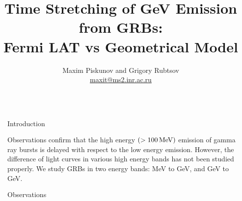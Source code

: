 \documentclass[final]{beamer}
\title{Time Stretching of GeV Emission from GRBs:\\[0.2ex]Fermi LAT vs Geometrical Model} %
\author{Maxim Piskunov and Grigory Rubtsov \\[.3ex] \normalsize \href{mailto:maxit@ms2.inr.ac.ru}{maxit@ms2.inr.ac.ru}} %
\institute{Institute for Nuclear Research RAS \\[2.0ex] \normalsize \url{https://github.com/maxitg/GammaRays}} %
\newlength{\sepwid}
\newlength{\onecolwid}
\begin{document}

\setlength{\belowcaptionskip}{2ex} %
\setlength\belowdisplayshortskip{2ex} %

\begin{frame}[t] %

\begin{columns}[t] %

\begin{column}{\sepwid}\end{column} %

\begin{column}{\onecolwid} %




\begin{block}{Introduction}

Observations confirm that the high energy $(> \unit[100]{MeV})$ emission of gamma ray bursts is delayed with respect to the low energy emission.
However, the difference of light curves in various high energy bands has not been studied properly.
We study GRBs in two energy bands: \unit[100]{MeV} to \unit[1]{GeV}, and \unit[1]{GeV} to \unit[300]{GeV}.

\end{block}


\begin{block}{Observations}


\end{block}
\end{column}
\end{columns}
\end{frame}
\end{document}
